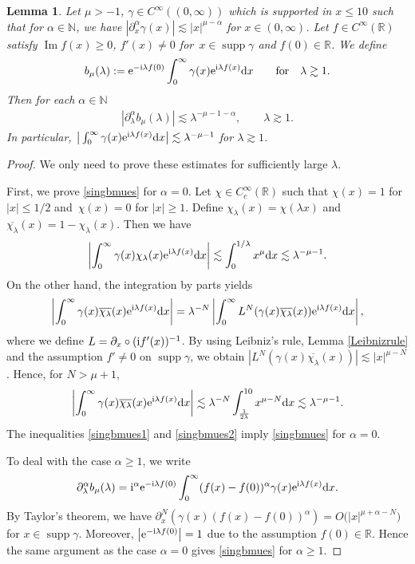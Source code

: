 \documentclass[pdftex]{sigma}
\numberwithin{equation}{section}
\newtheorem{Lemma}[Theorem]{Lemma}
\def\R{\mathbb{R}}%
\DeclareMathOperator{\supp}{supp}%
\DeclareMathOperator{\im}{Im}%
\def\a{\alpha}
\def\c{\gamma}
\def\l{\lambda}
\def\m{\mu}
\def\pa{\partial}
\begin{document}
\begin{Lemma}\label{singularasym}
Let $\m>-1$, $\c\in C^{\infty}((0,\infty))$ which is supported in $x\leq 10$ such that for $\a\in\mathbb{N}$, we have $|\pa_x^{\a}\c(x)|\lesssim |x|^{\m-\a}$ for $x\in (0,\infty)$. Let $f\in C^{\infty}(\R)$ satisfy $\im f(x)\geq 0$, $f'(x)\neq 0$ for~${x\in \supp \c}$ and $f(0)\in \R$. We define
\begin{align*}
b_{\m}(\l):={\rm e}^{-{\rm i}\l f(0)}\int_{0}^{\infty}\c(x){\rm e}^{{\rm i}\l f(x)}{\rm d}x\qquad \text{for}\quad \l\gtrsim 1.
\end{align*}
Then for each $\a\in\mathbb{N}$
\begin{align}\label{singbmues}
|\partial_{\l}^{\a}b_{\m}(\l)|\lesssim \l^{-\m-1-\a},\qquad \l\gtrsim 1.
\end{align}
In particular, $\big|\int_{0}^{\infty}\c(x){\rm e}^{{\rm i}\l f(x)}{\rm d}x\big|\lesssim \l^{-\m-1}$ for $\l\gtrsim 1$.
\end{Lemma}

\begin{proof}
We only need to prove these estimates for sufficiently large $\l$.

First, we prove \eqref{singbmues} for $\a=0$. Let $\chi\in C_c^{\infty}(\R)$ such that $\chi(x)=1$ for $|x|\leq 1/2$ and~${\chi(x)=0}$ for $|x|\geq 1$. Define $\chi_{\l}(x)=\chi(\l x)$ and $\overline{\chi_\l}(x)=1-\chi_{\l}(x)$. Then we have
\begin{align}\label{singbmues1}
\left|\int_{0}^{\infty}\c(x)\chi_{\l}(x){\rm e}^{{\rm i}\l f(x)}{\rm d}x\right|\lesssim \int_{0}^{1/\l}x^{\m}{\rm d}x\lesssim {\l}^{-\m-1}.
\end{align}
On the other hand, the integration by parts yields
\begin{align*}
\left|\int_{0}^{\infty}\c(x)\overline{\chi_{\l}}(x){\rm e}^{{\rm i}\l f(x)}{\rm d}x\right|=\l^{-N}\left|\int_{0}^{\infty}L^N(\c(x)\overline{\chi_{\l}}(x)){\rm e}^{{\rm i}\l f(x)}{\rm d}x\right|,
\end{align*}
where we define $L=\pa_x\circ ({\rm i}f'(x))^{-1}$. By using Leibniz's rule, Lemma \ref{Leibnizrule} and the assumption $f'\neq 0$ on $\supp \c$, we obtain $|L^{N}(\c(x)\overline{\chi_\l}(x))|\lesssim |x|^{\m-N}$. Hence, for $N>\m+1$,
\begin{align}\label{singbmues2}
\left|\int_{0}^{\infty}\c(x)\overline{\chi_{\l}}(x){\rm e}^{{\rm i}\l f(x)}{\rm d}x\right|\lesssim \l^{-N}\int_{\frac{1}{2\l}}^{10}x^{\m-N}{\rm d}x \lesssim \l^{-\m-1}.
\end{align}
The inequalities \eqref{singbmues1} and \eqref{singbmues2} imply \eqref{singbmues} for $\a=0$.

To deal with the case $\a\geq 1$, we write
\begin{align*}
\pa_{\l}^{\a}b_{\m}(\l)={\rm i}^{\a}{\rm e}^{-{\rm i}\l f(0)}\int_0^{\infty}(f(x)-f(0))^{\a}\c(x){\rm e}^{{\rm i}\l f(x)}{\rm d}x.
\end{align*}
By Taylor's theorem, we have $\pa_x^{N}(\c(x)(f(x)-f(0))^{\a})=O\bigl(|x|^{\m+\a-N}\bigr)$ for $x\in \supp \c$. Moreover, $\big|{\rm e}^{-{\rm i}\l f(0)}\big|=1$ due to the assumption $f(0)\in \R$.
Hence the same argument as the case $\a=0$ gives \eqref{singbmues} for $\a\geq 1$.
\end{proof}
\end{document}
